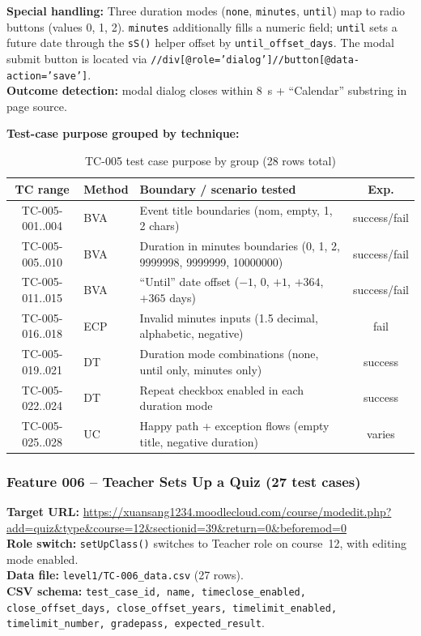 \documentclass[twoside,final]{hcmut-report}
\begin{document}
\textbf{Special handling:} Three duration modes (\texttt{none}, \texttt{minutes}, \texttt{until}) map to radio buttons (values 0, 1, 2). \texttt{minutes} additionally fills a numeric field; \texttt{until} sets a future date through the \texttt{sS()} helper offset by \texttt{until\_offset\_days}. The modal submit button is located via \texttt{//div[@role='dialog']//button[@data-action='save']}.\\
\textbf{Outcome detection:} modal dialog closes within 8~s + ``Calendar'' substring in page source.

\textbf{Test-case purpose grouped by technique:}
\begin{table}[H]
\centering
\renewcommand{\arraystretch}{1.2}
\begin{tabularx}{\textwidth}{|c|l|X|c|}
\hline
\textbf{TC range} & \textbf{Method} & \textbf{Boundary / scenario tested} & \textbf{Exp.} \\ \hline
TC-005-001..004 & BVA & Event title boundaries (nom, empty, 1, 2 chars) & success/fail \\ \hline
TC-005-005..010 & BVA & Duration in minutes boundaries (0, 1, 2, 9999998, 9999999, 10000000) & success/fail \\ \hline
TC-005-011..015 & BVA & ``Until'' date offset ($-1$, 0, $+1$, $+364$, $+365$ days) & success/fail \\ \hline
TC-005-016..018 & ECP & Invalid minutes inputs (1.5 decimal, alphabetic, negative) & fail \\ \hline
TC-005-019..021 & DT & Duration mode combinations (none, until only, minutes only) & success \\ \hline
TC-005-022..024 & DT & Repeat checkbox enabled in each duration mode & success \\ \hline
TC-005-025..028 & UC & Happy path + exception flows (empty title, negative duration) & varies \\ \hline
\end{tabularx}
\caption{TC-005 test case purpose by group (28 rows total)}
\end{table}

\subsubsection{Feature 006 -- Teacher Sets Up a Quiz (27 test cases)}

\textbf{Target URL:} \url{https://xuansang1234.moodlecloud.com/course/modedit.php?add=quiz&type&course=12&sectionid=39&return=0&beforemod=0}\\
\textbf{Role switch:} \texttt{setUpClass()} switches to Teacher role on course~12, with editing mode enabled.\\
\textbf{Data file:} \texttt{level1/TC-006\_data.csv} (27 rows).\\
\textbf{CSV schema:} \texttt{test\_case\_id, name, timeclose\_enabled, close\_offset\_days, close\_offset\_years, timelimit\_enabled, timelimit\_number, gradepass, expected\_result}.
\end{document}
